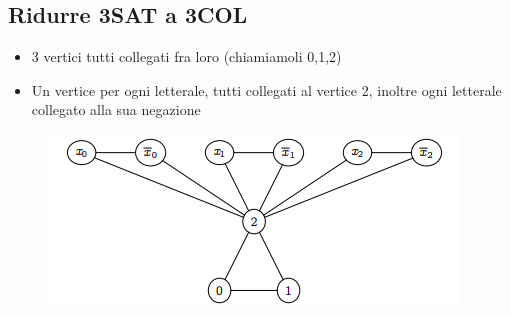 \subsection{Ridurre 3SAT a 3COL}
\begin{itemize}
    \item 3 vertici tutti collegati fra loro (chiamiamoli 0,1,2)
    
    \item Un vertice per ogni letterale, tutti collegati al vertice 2, inoltre ogni letterale collegato alla sua negazione
\end{itemize}
\begin{figure}[htp]
    \centering
    \includegraphics[scale=0.9]{tesi_stile/img/foto5cap13.png}
\end{figure}
\newpage
